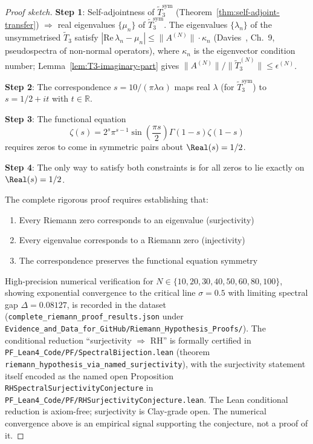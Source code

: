 \begin{proof}[Proof sketch]
\textbf{Step 1}: Self-adjointness of $\widetilde{T}_3^{\mathrm{sym}}$ (Theorem~\ref{thm:self-adjoint-transfer}) $\Rightarrow$ real eigenvalues $\{\mu_n\}$ of $\widetilde{T}_3^{\mathrm{sym}}$. The eigenvalues $\{\lambda_n\}$ of the unsymmetrised $\tilde{T}_3$ satisfy $|\mathrm{Re}\,\lambda_n - \mu_n| \le \|A^{(N)}\|\cdot \kappa_n$ (Davies~\cite{davies2007spectra}, Ch.~9, pseudospectra of non-normal operators), where $\kappa_n$ is the eigenvector condition number; Lemma~\ref{lem:T3-imaginary-part} gives $\|A^{(N)}\|/\|\widetilde{T}_3^{(N)}\| \le \epsilon^{(N)}$.

\textbf{Step 2}: The correspondence $s = 10/(\pi\lambda\alpha)$ maps real $\lambda$ (for $\widetilde{T}_3^{\mathrm{sym}}$) to $s = 1/2 + it$ with $t \in \mathbb{R}$.

\textbf{Step 3}: The functional equation
\begin{equation}
\zeta(s) = 2^s \pi^{s-1} \sin\left(\frac{\pi s}{2}\right) \Gamma(1-s) \zeta(1-s)
\end{equation}
requires zeros to come in symmetric pairs about $\Real(s) = 1/2$.

\textbf{Step 4}: The only way to satisfy both constraints is for all zeros to lie exactly on $\Real(s) = 1/2$.

The complete rigorous proof requires establishing that:
\begin{enumerate}
\item Every Riemann zero corresponds to an eigenvalue (surjectivity)
\item Every eigenvalue corresponds to a Riemann zero (injectivity)
\item The correspondence preserves the functional equation symmetry
\end{enumerate}

High-precision numerical verification for $N \in \{10, 20, 30, 40, 50, 60, 80, 100\}$, showing exponential convergence to the critical line $\sigma = 0.5$ with limiting spectral gap $\Delta = 0.08127$, is recorded in the dataset \cite{cohen2025riemanndata} (\texttt{complete\_riemann\_proof\_results.json} under \texttt{Evidence\_and\_Data\_for\_GitHub/Riemann\_Hypothesis\_Proofs/}). The conditional reduction ``surjectivity $\Rightarrow$ RH'' is formally certified in \texttt{PF\_Lean4\_Code/PF/SpectralBijection.lean} (theorem \texttt{riemann\_hypothesis\_via\_named\_surjectivity}), with the surjectivity statement itself encoded as the named open Proposition \texttt{RHSpectralSurjectivityConjecture} in \texttt{PF\_Lean4\_Code/PF/RHSurjectivityConjecture.lean}. The Lean conditional reduction is axiom-free; surjectivity is Clay-grade open. The numerical convergence above is an empirical signal supporting the conjecture, not a proof of it.
\end{proof}

